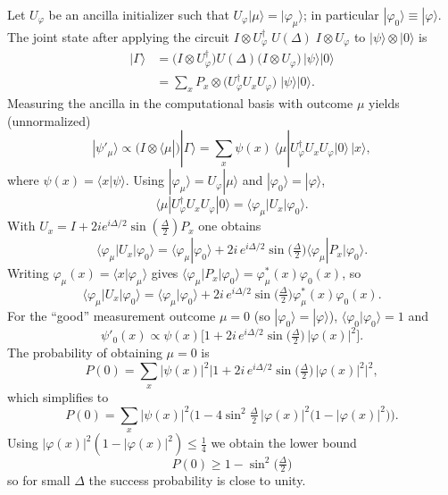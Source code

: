 \documentclass[12pt,a4paper]{article}
\begin{document}
Let \(U_\varphi\) be an ancilla initializer such that \(U_\varphi|\mu\rangle=|\varphi_\mu\rangle\); in particular \(|\varphi_0\rangle\equiv|\varphi\rangle\). The joint state after applying the circuit \(I\otimes U_\varphi^\dagger\; U(\Delta)\; I\otimes U_\varphi\) to \(|\psi\rangle\otimes|0\rangle\) is
\begin{align}
|\Gamma\rangle
&= \big(I\otimes U_\varphi^\dagger\big)U(\Delta)\big(I\otimes U_\varphi\big)\,|\psi\rangle|0\rangle
\nonumber\\
&= \sum_x P_x \otimes \big(U_\varphi^\dagger U_x U_\varphi\big)\;|\psi\rangle|0\rangle .
\tag{B1}
\end{align}
Measuring the ancilla in the computational basis with outcome \(\mu\) yields (unnormalized)
\[
|\psi'_\mu\rangle \propto \big(I\otimes\langle\mu|\big)|\Gamma\rangle
= \sum_x \psi(x)\,\langle\mu|U_\varphi^\dagger U_x U_\varphi|0\rangle\,|x\rangle ,
\tag{B2}
\]
where \(\psi(x)=\langle x|\psi\rangle\). Using \(|\varphi_\mu\rangle=U_\varphi|\mu\rangle\) and \(|\varphi_0\rangle=|\varphi\rangle\),
\[
\langle\mu|U_\varphi^\dagger U_x U_\varphi|0\rangle = \langle\varphi_\mu|U_x|\varphi_0\rangle.
\]
With \(U_x = I + 2i e^{i\Delta/2}\sin(\tfrac{\Delta}{2})P_x\) one obtains
\[
\langle\varphi_\mu|U_x|\varphi_0\rangle
= \langle\varphi_\mu|\varphi_0\rangle
+ 2i\,e^{i\Delta/2}\sin\!\Big(\tfrac{\Delta}{2}\Big)\langle\varphi_\mu|P_x|\varphi_0\rangle.
\tag{B3}
\]
Writing \(\varphi_\mu(x)=\langle x|\varphi_\mu\rangle\) gives \(\langle\varphi_\mu|P_x|\varphi_0\rangle=\varphi_\mu^*(x)\varphi_0(x)\), so
\[
\langle\varphi_\mu|U_x|\varphi_0\rangle
= \langle\varphi_\mu|\varphi_0\rangle
+ 2i\,e^{i\Delta/2}\sin\!\Big(\tfrac{\Delta}{2}\Big)\varphi_\mu^*(x)\varphi_0(x).
\]
For the ``good'' measurement outcome \(\mu=0\) (so \(|\varphi_0\rangle=|\varphi\rangle\)), \(\langle\varphi_0|\varphi_0\rangle=1\) and
\[
\psi'_0(x)\propto \psi(x)\Big[1+2i\,e^{i\Delta/2}\sin\!\Big(\tfrac{\Delta}{2}\Big)\,|\varphi(x)|^2\Big].
\tag{B4}
\]
The probability of obtaining \(\mu=0\) is
\[
P(0)=\sum_x |\psi(x)|^2\Big|1+2i\,e^{i\Delta/2}\sin\!\Big(\tfrac{\Delta}{2}\Big)\,|\varphi(x)|^2\Big|^2,
\]
which simplifies to
\begin{equation}
P(0)=\sum_x |\psi(x)|^2\Big(1-4\sin^2\!\tfrac{\Delta}{2}\,|\varphi(x)|^2\big(1-|\varphi(x)|^2\big)\Big).
\tag{B5}
\end{equation}
Using \( |\varphi(x)|^2(1-|\varphi(x)|^2)\le\tfrac14\) we obtain the lower bound
\[
\boxed{ \; P(0)\ge 1-\sin^2\!\Big(\tfrac{\Delta}{2}\Big) \; } \tag{B6}
\]
so for small \(\Delta\) the success probability is close to unity.
\end{document}
